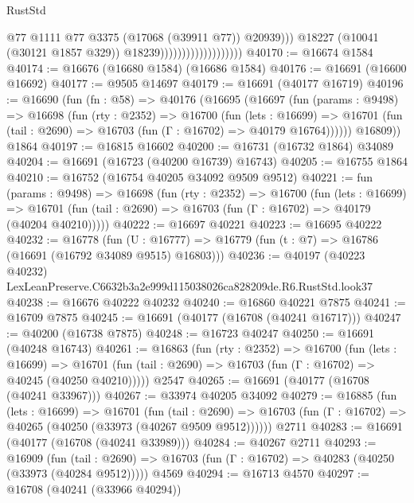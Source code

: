 \begin{lexlean}{RustStd}
\begin{coremodule}
                                                @77
                                                @1111
                                                @77
                                                @3375
                                                (@17068 (@39911 @77))
                                                @20939)))
                                          @18227
                                          (@10041 (@30121 @1857 @329))
                                          @18239)))))))))))))))))))
@40170 := @16674 @1584
@40174 := @16676 (@16680 @1584) (@16686 @1584)
@40176 := @16691 (@16600 @16692)
@40177 := @9505 @14697
@40179 := @16691 (@40177 @16719)
@40196 := @16690
    (fun (fn : @58) =>
    @40176
      (@16695
        (@16697
          (fun (params : @9498) =>
          @16698
            (fun (rty : @2352) =>
            @16700
              (fun (lets : @16699) =>
              @16701 (fun (tail : @2690) => @16703 (fun (Γ : @16702) => @40179 @16764))))))
        @16809))
    @1864
@40197 := @16815 @16602
@40200 := @16731 (@16732 @1864) @34089
@40204 := @16691 (@16723 (@40200 @16739) @16743)
@40205 := @16755 @1864
@40210 := @16752 (@16754 @40205 @34092 @9509 @9512)
@40221 := fun (params : @9498) =>
  @16698
    (fun (rty : @2352) =>
    @16700
      (fun (lets : @16699) =>
      @16701 (fun (tail : @2690) => @16703 (fun (Γ : @16702) => @40179 (@40204 @40210)))))
@40222 := @16697 @40221
@40223 := @16695 @40222
@40232 := @16778
    (fun (U : @16777) => @16779 (fun (t : @7) => @16786 (@16691 (@16792 @34089 @9515) @16803)))
@40236 := @40197 (@40223 @40232) LexLeanPreserve.C6632b3a2e999d115038026ca828209de.R6.RustStd.look37
@40238 := @16676 @40222 @40232
@40240 := @16860 @40221 @7875
@40241 := @16709 @7875
@40245 := @16691 (@40177 (@16708 (@40241 @16717)))
@40247 := @40200 (@16738 @7875)
@40248 := @16723 @40247
@40250 := @16691 (@40248 @16743)
@40261 := @16863
    (fun (rty : @2352) =>
    @16700
      (fun (lets : @16699) =>
      @16701 (fun (tail : @2690) => @16703 (fun (Γ : @16702) => @40245 (@40250 @40210)))))
    @2547
@40265 := @16691 (@40177 (@16708 (@40241 @33967)))
@40267 := @33974 @40205 @34092
@40279 := @16885
    (fun (lets : @16699) =>
    @16701
      (fun (tail : @2690) =>
      @16703 (fun (Γ : @16702) => @40265 (@40250 (@33973 (@40267 @9509 @9512))))))
    @2711
@40283 := @16691 (@40177 (@16708 (@40241 @33989)))
@40284 := @40267 @2711
@40293 := @16909
    (fun (tail : @2690) => @16703 (fun (Γ : @16702) => @40283 (@40250 (@33973 (@40284 @9512)))))
    @4569
@40294 := @16713 @4570
@40297 := @16708 (@40241 (@33966 @40294))

\end{coremodule}
\end{lexlean}

